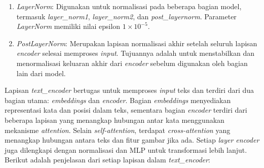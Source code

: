 \begin{enumerate}
    \item \textit{LayerNorm}: Digunakan untuk normalisasi pada beberapa bagian model, termasuk \textit{layer\_norm1}, \textit{layer\_norm2}, dan \textit{post\_layernorm}. Parameter \textit{LayerNorm} memiliki nilai epsilon $1 \times 10^{-5}$.

    \item \textit{PostLayerNorm}: Merupakan lapisan normalisasi akhir setelah seluruh lapisan \textit{encoder} selesai memproses \textit{input}. Tujuannya adalah untuk menstabilkan dan menormalisasi keluaran akhir dari \textit{encoder} sebelum digunakan oleh bagian lain dari model.


  
\end{enumerate}

\par Lapisan \textit{text\_encoder} bertugas untuk memproses \textit{input} teks dan terdiri dari dua bagian utama: \textit{embeddings} dan \textit{encoder}. Bagian \textit{embeddings} menyediakan representasi kata dan posisi dalam teks, sementara bagian \textit{encoder} terdiri dari beberapa lapisan yang menangkap hubungan antar kata menggunakan mekanisme \textit{attention}. Selain \textit{self-attention}, terdapat \textit{cross-attention} yang menangkap hubungan antara teks dan fitur gambar jika ada. Setiap \textit{layer encoder} juga dilengkapi dengan normalisasi dan MLP untuk transformasi lebih lanjut. Berikut adalah penjelasan dari setiap lapisan dalam \textit{text\_encoder}:

